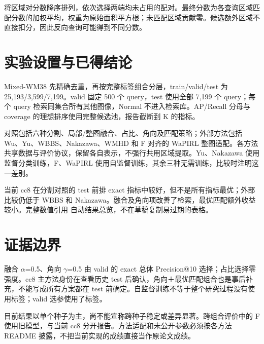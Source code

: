 \documentclass[UTF8,a4paper,11pt,fontset=fandol]{ctexart}
\begin{document}
将区域对分数降序排列，依次选择两端均未占用的配对。最终分数为各查询区域匹配分数的加权平均，权重为原始面积平方根；未匹配区域贡献零。候选额外区域不直接扣分，因此反向查询可能得到不同分数。

\section{实验设置与已得结论}

Mixed-WM38 先精确去重，再按完整标签组合分层，train/valid/test 为 25,193/3,599/7,199。valid 固定 500 个 query，test 使用全部 7,199 个 query；每个 query 检索同集合所有其他图像，Normal 不进入检索库。AP/Recall 分母与 coverage 的理想排序使用完整候选池，报告截断到 K 的指标。

对照包括六种分割、局部/整图融合、占比、角向及匹配策略；外部方法包括 Wu、Yu、WBBS、Nakazawa、WMHD 和 F 对齐的 WaPIRL 整图适配。各方法共享数据与评价协议，保留各自表示，不强行共用区域提取。Yu、Nakazawa 使用监督分类训练，F、WaPIRL 使用自监督训练，其余三种无需训练，比较时注明这一差别。

当前 cc8 在分割对照的 test 前排 exact 指标中较好，但不是所有指标最优；外部比较仍低于 WBBS 和 Nakazawa。融合及角向项改善了检索，最优匹配额外收益较小。完整数值引用 自动结果总览，不在草稿复制易过期的表格。

\section{证据边界}

融合 \(\alpha\)=0.5、角向 \(\gamma\)=0.5 由 valid 的 exact 总体 Precision@10 选择；占比选择零强度。cc8 主方法身份在查看历史 test 后确认，角向＋最优匹配组合也是事后补充，不能写成所有方案都在 test 前确定。自监督训练不等于整个研究过程没有使用标签；valid 选参使用了标签。

目前结果以单个种子为主，尚不能宣称跨种子稳定或差异显著。跨组合评价中的 F 使用旧模型，与当前 cc8 分开报告。方法适配和未公开参数必须按各方法 README 披露，不把当前实现的成绩直接当作原论文成绩。
\end{document}

